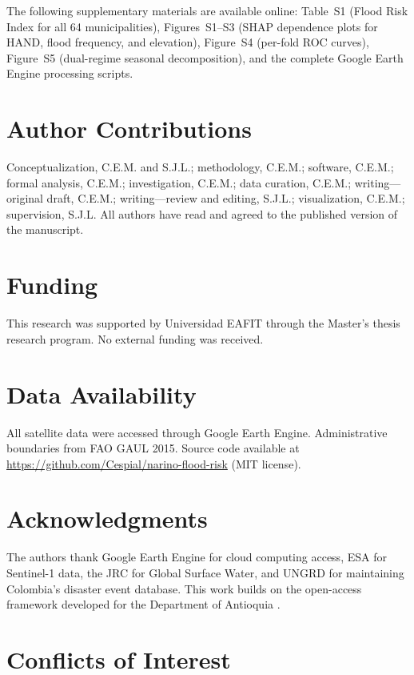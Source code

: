 \documentclass{article}
\begin{document}
The following supplementary materials are available online: Table~S1 (Flood Risk Index for all 64 municipalities), Figures~S1--S3 (SHAP dependence plots for HAND, flood frequency, and elevation), Figure~S4 (per-fold ROC curves), Figure~S5 (dual-regime seasonal decomposition), and the complete Google Earth Engine processing scripts.

\section*{Author Contributions}

Conceptualization, C.E.M. and S.J.L.; methodology, C.E.M.; software, C.E.M.; formal analysis, C.E.M.; investigation, C.E.M.; data curation, C.E.M.; writing---original draft, C.E.M.; writing---review and editing, S.J.L.; visualization, C.E.M.; supervision, S.J.L. All authors have read and agreed to the published version of the manuscript.

\section*{Funding}

This research was supported by Universidad EAFIT through the Master's thesis research program. No external funding was received.

\section*{Data Availability}

All satellite data were accessed through Google Earth Engine. Administrative boundaries from FAO GAUL 2015. Source code available at \url{https://github.com/Cespial/narino-flood-risk} (MIT license).

\section*{Acknowledgments}

The authors thank Google Earth Engine for cloud computing access, ESA for Sentinel-1 data, the JRC for Global Surface Water, and UNGRD for maintaining Colombia's disaster event database. This work builds on the open-access framework developed for the Department of Antioquia \citep{EspinalMaya2026Antioquia}.

\section*{Conflicts of Interest}
\end{document}
